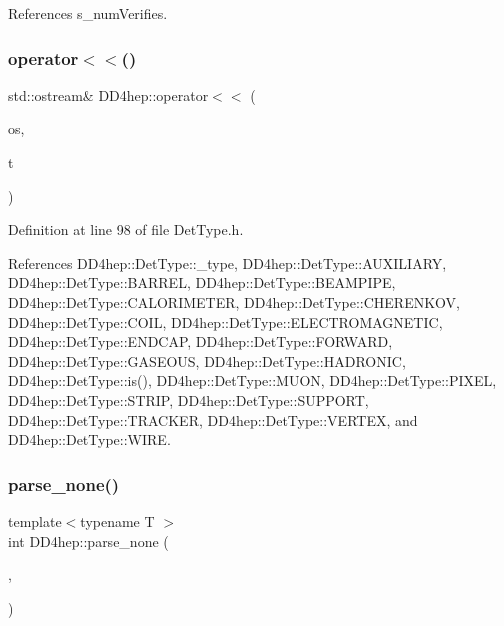 References s\+\_\+num\+Verifies.

\hypertarget{namespace_d_d4hep_aca377a4dd449424cf1da9d44dda78433}{}\label{namespace_d_d4hep_aca377a4dd449424cf1da9d44dda78433} 
\subsubsection{\texorpdfstring{operator$<$$<$()}{operator<<()}}
{\footnotesize\ttfamily std\+::ostream\& D\+D4hep\+::operator$<$$<$ (\begin{DoxyParamCaption}\item[{std\+::ostream \&}]{os,  }\item[{const \hyperlink{class_d_d4hep_1_1_det_type}{Det\+Type} \&}]{t }\end{DoxyParamCaption})\hspace{0.3cm}{\ttfamily [inline]}}



Definition at line 98 of file Det\+Type.\+h.



References D\+D4hep\+::\+Det\+Type\+::\+\_\+type, D\+D4hep\+::\+Det\+Type\+::\+A\+U\+X\+I\+L\+I\+A\+RY, D\+D4hep\+::\+Det\+Type\+::\+B\+A\+R\+R\+EL, D\+D4hep\+::\+Det\+Type\+::\+B\+E\+A\+M\+P\+I\+PE, D\+D4hep\+::\+Det\+Type\+::\+C\+A\+L\+O\+R\+I\+M\+E\+T\+ER, D\+D4hep\+::\+Det\+Type\+::\+C\+H\+E\+R\+E\+N\+K\+OV, D\+D4hep\+::\+Det\+Type\+::\+C\+O\+IL, D\+D4hep\+::\+Det\+Type\+::\+E\+L\+E\+C\+T\+R\+O\+M\+A\+G\+N\+E\+T\+IC, D\+D4hep\+::\+Det\+Type\+::\+E\+N\+D\+C\+AP, D\+D4hep\+::\+Det\+Type\+::\+F\+O\+R\+W\+A\+RD, D\+D4hep\+::\+Det\+Type\+::\+G\+A\+S\+E\+O\+US, D\+D4hep\+::\+Det\+Type\+::\+H\+A\+D\+R\+O\+N\+IC, D\+D4hep\+::\+Det\+Type\+::is(), D\+D4hep\+::\+Det\+Type\+::\+M\+U\+ON, D\+D4hep\+::\+Det\+Type\+::\+P\+I\+X\+EL, D\+D4hep\+::\+Det\+Type\+::\+S\+T\+R\+IP, D\+D4hep\+::\+Det\+Type\+::\+S\+U\+P\+P\+O\+RT, D\+D4hep\+::\+Det\+Type\+::\+T\+R\+A\+C\+K\+ER, D\+D4hep\+::\+Det\+Type\+::\+V\+E\+R\+T\+EX, and D\+D4hep\+::\+Det\+Type\+::\+W\+I\+RE.

\hypertarget{namespace_d_d4hep_a54eac6cc7ef181c9538f52f26a3bac9e}{}\label{namespace_d_d4hep_a54eac6cc7ef181c9538f52f26a3bac9e} 
\subsubsection{\texorpdfstring{parse\+\_\+none()}{parse\_none()}}
{\footnotesize\ttfamily template$<$typename T $>$ \\
int D\+D4hep\+::parse\+\_\+none (\begin{DoxyParamCaption}\item[{\hyperlink{class_t}{T} \&}]{,  }\item[{const std\+::string \&}]{ }\end{DoxyParamCaption})\hspace{0.3cm}{\ttfamily [inline]}}



